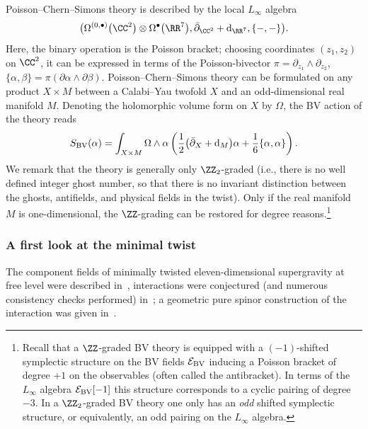 \documentclass[pdftex]{sigma}
\numberwithin{equation}{section}
\theoremstyle{definition}
\def\cE{\mathcal E}\def\cF{\mathcal F}\def\cG{\mathcal G}\def\cH{\mathcal H}
\def\d{{\rm d}}
\begin{document}
Poisson--Chern--Simons theory is described by the local $L_\infty$ algebra
\[
 \big( \Omega^{(0,\bullet)}\big(\CC^2\big) \otimes \Omega^\bullet\big(\RR^7\big) , \bar{\partial}_{\CC^2} + \d_{\RR^7} , \{-,-\} \big).
\]
Here, the binary operation is the Poisson bracket; choosing coordinates $(z_1,z_2)$ on $\CC^2$, it can be expressed in terms of the Poisson-bivector $\pi= \partial_{z_1} \wedge \partial_{z_2}$,
$
 \{\alpha,\beta\} = \pi(\partial \alpha \wedge \partial \beta) $.
Poisson--Chern--Simons theory can be formulated on any product $X\times M$ between a Calabi--Yau twofold $X$ and an odd-dimensional real manifold $M$. Denoting the holomorphic volume form on $X$ by $\Omega$, the BV action of the theory reads
\[
	S_{\rm BV}(\alpha) = \int_{X \times M} \Omega \wedge \alpha \left( \frac{1}{2}\big(\bar{\partial}_X + \d_M\big) \alpha + \frac{1}{6} \{ \alpha , \alpha \} \right) .
\]
We remark that the theory is generally only $\ZZ_2$-graded (i.e., there is no well defined integer ghost number, so that there is no invariant distinction between the ghosts, antifields, and physical fields in the twist). Only if the real manifold $M$ is one-dimensional, the $\ZZ$-grading can be restored for degree reasons.\footnote{Recall that a $\ZZ$-graded BV theory is equipped with a $(-1)$-shifted symplectic structure on the BV fields $\cE_{\rm BV}$ inducing a Poisson bracket of degree $+1$ on the observables (often called the antibracket). In terms of the $L_\infty$ algebra $\cE_{\rm BV}[-1]$ this structure corresponds to a cyclic pairing of degree $-3$. In a $\ZZ_2$-graded BV theory one only has an \emph{odd} shifted symplectic structure, or equivalently, an odd pairing on the $L_\infty$ algebra.}

\subsubsection{A first look at the minimal twist}
The component fields of minimally twisted eleven-dimensional supergravity at free level were described in~\cite{Ced-SL5,spinortwist}, interactions were conjectured (and numerous consistency checks performed) in~\cite{RSW}; a geometric pure spinor construction of the interaction was given in~\cite{CY2}.
\end{document}
